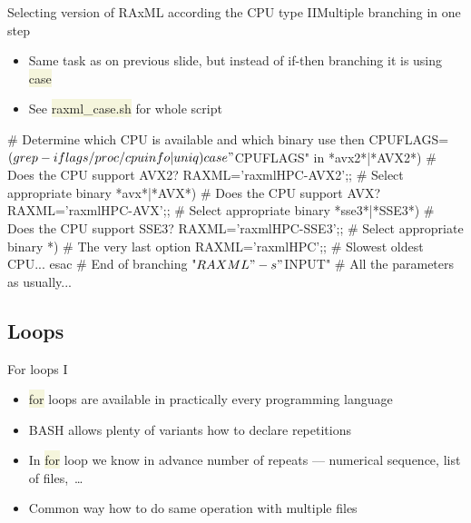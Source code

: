 \documentclass[compress, xelatex, 11pt, xcolor=svgnames, aspectratio=169, url={hyphens, lowtilde}]{beamer}
\renewcommand{\texttt}[1]{\colorbox{Beige}{{\ttfamily #1}}}
\begin{document}
\begin{frame}[fragile]{Selecting version of RAxML according the CPU type II}{Multiple branching in one step}
	\begin{itemize}
		\item Same task as on previous slide, but instead of if-then branching it is using \texttt{case}
		\item See \texttt{raxml\_case.sh} for whole script
	\end{itemize}
	\vfill
	\begin{bashcode}
    # Determine which CPU is available and which binary use then
    CPUFLAGS=$(grep -i flags /proc/cpuinfo | uniq)
    case "${CPUFLAGS}" in
      *avx2*|*AVX2*) # Does the CPU support AVX2?
        RAXML='raxmlHPC-AVX2';; # Select appropriate binary
      *avx*|*AVX*) # Does the CPU support AVX?
        RAXML='raxmlHPC-AVX';; # Select appropriate binary
      *sse3*|*SSE3*) # Does the CPU support SSE3?
        RAXML='raxmlHPC-SSE3';; # Select appropriate binary
      *) # The very last option
        RAXML='raxmlHPC';; # Slowest oldest CPU...
      esac # End of branching
    "${RAXML}" -s "${INPUT}" # All the parameters as usually...
	\end{bashcode}
\end{frame}

\subsection{Loops}

\begin{frame}[fragile]{For loops I} %
	\begin{itemize}
		\item \texttt{for} loops are available in practically every programming language
		\item BASH allows plenty of variants how to declare repetitions
		\item In \texttt{for} loop we know in advance number of repeats --- numerical sequence, list of files,~\ldots
		\item Common way how to do same operation with multiple files
	\end{itemize}
\end{frame}
\end{document}
